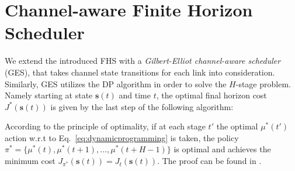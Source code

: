 \section{Channel-aware Finite Horizon Scheduler} \label{sec:gescheduler}

We extend the introduced FHS with a \textit{Gilbert-Elliot channel-aware
scheduler} (GES), that takes channel state transitions for each link into
consideration. Similarly, GES utilizes the DP algorithm in order to solve the
$H$-stage problem. Namely starting at state $\boldsymbol{s}(t)$ and time $t$,
the optimal final horizon cost $J^*(\boldsymbol{s}(t))$ is given by the last
step of the following algorithm:

\begin{center}
\end{center}
  

According to the principle of optimality, if at each stage $t'$ the optimal
$\mu^*(t')$ action w.r.t to Eq.~\eqref{eq:dynamicprogramming} is taken, the
policy $\pi^* = \{\mu^*(t), \mu^*(t+1), \dots, \mu^*(t + H-1)\}$ is optimal and
achieves the minimum cost $J_{\pi^*}(\boldsymbol{s}(t)) = J_t(\boldsymbol{s}(t))
$. The proof can be found in \cite{bertsekas1995dynamic}.


